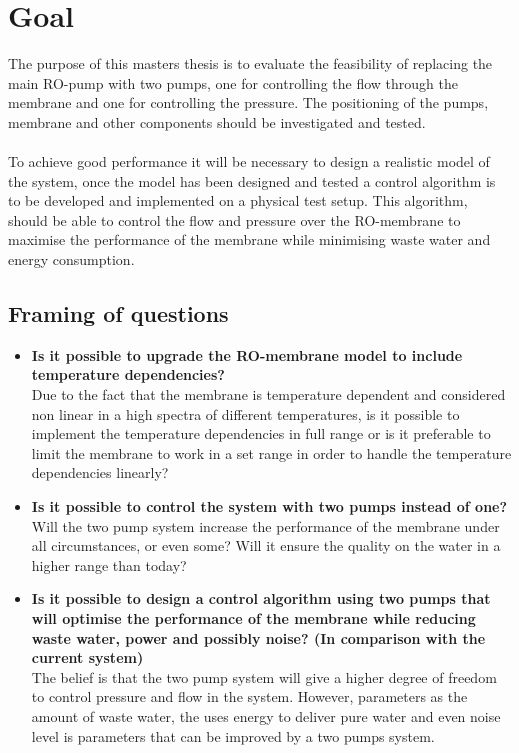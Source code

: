 \section{Goal}
The purpose of this masters thesis is to evaluate the feasibility of replacing the main RO-pump with two pumps, one for controlling the flow through the membrane and one for controlling the pressure. The positioning of the pumps, membrane and other components should be investigated and tested. \\
\\
To achieve good performance it will be necessary to design a realistic model of the system, once the model has been designed and tested a control algorithm is to be developed and implemented on a physical test setup. This algorithm, should be able to control the flow and pressure over the RO-membrane to maximise the performance of the membrane while minimising waste water and energy consumption. \\


\subsection{Framing of questions}
\label{framing}
\begin{itemize}
\renewcommand\labelitemi{-}
   \item \textbf{Is it possible to upgrade the RO-membrane model to include temperature dependencies?}\\ Due to the fact that the membrane is temperature dependent and considered non linear in a high spectra of different temperatures, is it possible to implement the temperature dependencies in full range or is it preferable to limit the membrane to work in a set range in order to handle the temperature dependencies linearly?
   \item \textbf{Is it possible to control the system with two pumps instead of one?}\\ Will the two pump system increase the performance of the membrane under all circumstances, or even some? Will it ensure the quality on the water in a higher range than today?   
   \item \textbf{Is it possible to design a control algorithm using two pumps that will optimise the performance of the membrane while reducing waste water, power and possibly noise? (In comparison with the current system)}\\ The belief is that the two pump system will give a higher degree of freedom to control pressure and flow in the system. However, parameters as the amount of waste water, the uses energy to deliver pure water and even noise level is parameters that can be improved by a two pumps system.  
\end{itemize}


